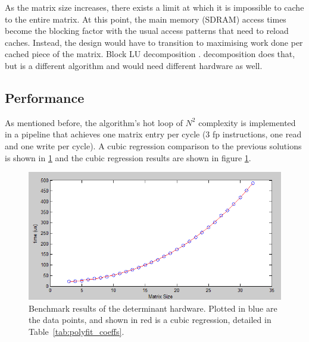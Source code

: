 \documentclass[]{article}
\begin{document}
As the matrix size increases, there exists a limit at which it is impossible to cache to the entire matrix. At this point, the main memory (SDRAM) access times become the blocking factor with the usual access patterns that need to reload caches. Instead, the design would have to transition to maximising work done per cached piece of the matrix. Block LU decomposition \cite{LUgen}. decomposition does that, but is a different algorithm and would need different hardware as well.

\subsection{Performance} %
\label{sub:performancedet}


As mentioned before, the algorithm’s hot loop of $N^2$ complexity is implemented in a pipeline that achieves one matrix entry per cycle (3 fp instructions, one read and one write per cycle). A cubic regression comparison to the previous solutions is shown in \ref{fig:det_bench_results} and the cubic regression results are shown in figure \ref{fig:det_bench_results}.

\begin{figure}[htbp]
	\begin{center}
		\includegraphics[width = \textwidth]{detcubicresult.PNG}
	\end{center}
	\caption{Benchmark results of the determinant hardware. Plotted in blue are the data points, and shown in red is a cubic regression, detailed in Table~\ref{tab:polyfit_coeffs}.}
	\label{fig:det_bench_results}
\end{figure}
	
\end{document}
